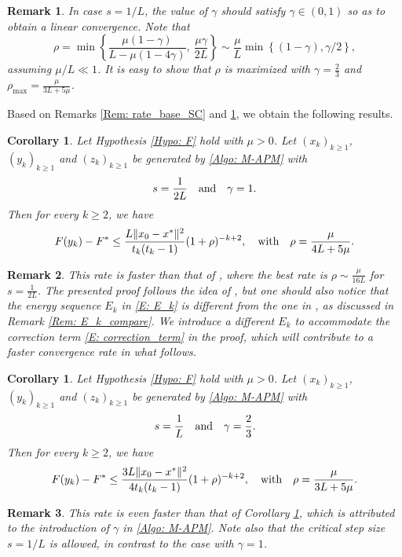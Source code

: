 \documentclass[pdflatex,sn-mathphys-num]{sn-jnl}
\theoremstyle{thmstyleone}
\newtheorem{corollary}[theorem]{Corollary}
\theoremstyle{thmstyletwo}
\newtheorem{remark}{Remark}
\theoremstyle{thmstylethree}
\newcommand{\qbox}[1]{\quad\hbox{#1}\quad}
\begin{document}
\begin{remark}\label{Rem: rate_fast_SC}
In case $s=1/L$, the value of $\gamma$ should satisfy $\gamma\in(0,1)$ so as to obtain a linear convergence. Note that
$$ \rho = \min\left\{ \frac{\mu(1-\gamma)}{ L- \mu (1-4\gamma) },\ 
\frac{\mu\gamma}{2L}
 \right\}
 \sim
 \frac{\mu}{L}\min\left\{ (1-\gamma), \gamma/2 \right\}, $$
assuming $\mu/L\ll 1$. It is easy to show that $\rho$ is maximized with $\gamma=\frac{2}{3}$ and $\rho_{\max} = \frac{\mu}{3L+5\mu}$.
\end{remark}


Based on Remarks \ref{Rem: rate_base_SC} and \ref{Rem: rate_fast_SC}, we obtain the following results.


\begin{corollary}\label{Cor: rate_base_SC}
Let Hypothesis \ref{Hypo: F} hold with $\mu>0$. Let $(x_k)_{k\ge 1}$, $(y_k)_{k\ge 1}$ and $(z_k)_{k\ge 1}$ be generated by \eqref{Algo: M-APM} with 
$$s=\frac{1}{2L} \qbox{and} \gamma=1.  $$
Then for every $k\ge 2$, we have 
$$ F(y_k) - F^* \le \frac{L\| x_0 - x^* \|^2}{t_k(t_k-1)}(1+\rho)^{-k+2},\qbox{with}
\rho = \frac{\mu}{4L+5\mu}.$$
\end{corollary} 

\begin{remark}
This rate is faster than that of \cite{Shi_2024_Monotone}, where the best rate is $\rho\sim \frac{\mu}{16L}$ for $s=\frac{1}{2L}$. The presented proof follows the idea of \cite{Bao_2023}, but one should also notice that the energy sequence $E_k$ in \eqref{E: E_k} is different from the one in \cite{Bao_2023}, as discussed in Remark \ref{Rem: E_k_compare}. We introduce a different $E_k$ to accommodate the correction term \eqref{E: correction_term} in the proof, which will contribute to a faster convergence rate in what follows.  
\end{remark}


\begin{corollary}\label{Cor: rate_fast_SC}
Let Hypothesis \ref{Hypo: F} hold with $\mu>0$. Let $(x_k)_{k\ge 1}$, $(y_k)_{k\ge 1}$ and $(z_k)_{k\ge 1}$ be generated by \eqref{Algo: M-APM} with 
$$s=\frac{1}{L} \qbox{and} \gamma=\frac{2}{3}.  $$
Then for every $k\ge 2$, we have 
$$ F(y_k) - F^* \le \frac{3L\| x_0 - x^* \|^2}{4 t_k(t_k-1)}(1+\rho)^{-k+2},\qbox{with}\rho = \frac{\mu}{3L+5\mu}.$$
\end{corollary}


\begin{remark}
This rate is even faster than that of Corollary \ref{Cor: rate_base_SC}, which is attributed to the introduction of $\gamma$ in \eqref{Algo: M-APM}. Note also that the critical step size $s=1/L$ is allowed, in contrast to the case with $\gamma=1$.  
\end{remark}
\end{document}
